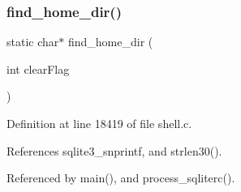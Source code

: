 \subsubsection{find\+\_\+home\+\_\+dir()}
{\footnotesize\ttfamily static char$\ast$ find\+\_\+home\+\_\+dir (\begin{DoxyParamCaption}\item[{int}]{clear\+Flag }\end{DoxyParamCaption})\hspace{0.3cm}{\ttfamily [static]}}



Definition at line 18419 of file shell.\+c.



References sqlite3\+\_\+snprintf, and strlen30().



Referenced by main(), and process\+\_\+sqliterc().



